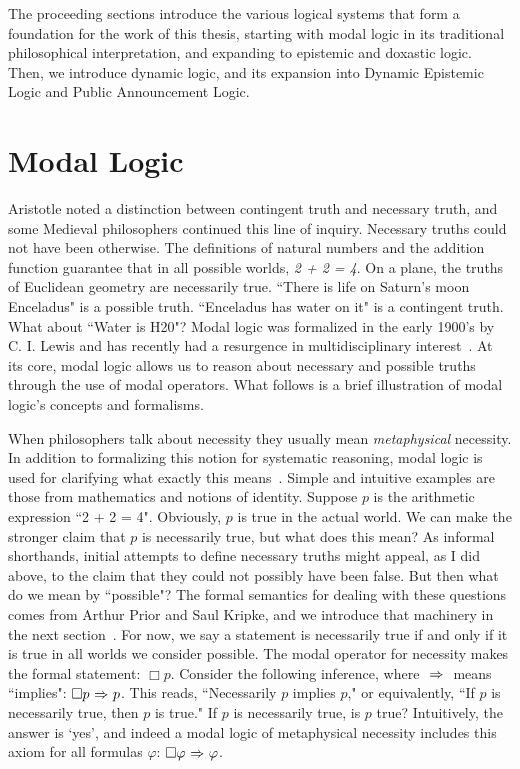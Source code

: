 The proceeding sections introduce the various logical systems that form a foundation for the work of this thesis, starting with modal logic in its traditional philosophical interpretation, and expanding to epistemic and doxastic logic. Then, we introduce dynamic logic, and its expansion into Dynamic Epistemic Logic and Public Announcement Logic.

\section{Modal Logic}\label{sec:logic_foundation}
Aristotle noted a distinction between contingent truth and necessary truth, and some Medieval philosophers continued this line of inquiry. Necessary truths could not have been otherwise. The definitions of natural numbers and the addition function guarantee that in all possible worlds, \emph{2 + 2 = 4}. On a plane, the truths of Euclidean geometry are necessarily true. ``There is life on Saturn's moon Enceladus" is a possible truth. ``Enceladus has water on it" is a contingent truth. What about ``Water is H20"? Modal logic was formalized in the early 1900's by C. I. Lewis and has recently had a resurgence in multidisciplinary interest~\cite{VB_MLOM}. At its core, modal logic allows us to reason about necessary and possible truths through the use of modal operators. What follows is a brief illustration of modal logic's concepts and formalisms.

When philosophers talk about necessity they usually mean \emph{metaphysical} necessity. In addition to formalizing this notion for systematic reasoning, modal logic is used for clarifying what exactly this means~\cite{Williamson}. Simple and intuitive examples are those from mathematics and notions of identity. Suppose $p$ is the arithmetic expression ``2 + 2 = 4". Obviously, $p$ is true in the actual world. We can make the stronger claim that $p$ is necessarily true, but what does this mean? As informal shorthands, initial attempts to define necessary truths might appeal, as I did above, to the claim that they could not possibly have been false. But then what do we mean by ``possible"? The formal semantics for dealing with these questions comes from Arthur Prior and Saul Kripke, and we introduce that machinery in the next section~\cite{Prior,Kripke}. For now, we say a statement is necessarily true if and only if it is true in all worlds we consider possible. The modal operator for necessity makes the formal statement: $\Box p$. Consider the following inference, where ${\ \Rightarrow \ }$ means ``implies": $\Box p {\ \Rightarrow \ } p$. This reads, ``Necessarily $p$ implies $p$," or equivalently, ``If $p$ is necessarily true, then $p$ is true." If $p$ is necessarily true, is $p$ true? Intuitively, the answer is `yes', and indeed a modal logic of metaphysical necessity includes this axiom for all formulas $\varphi$: $\Box \varphi {\ \Rightarrow \ } \varphi$. 

